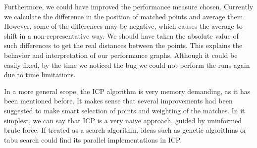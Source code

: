 \documentclass[11pt]{article}
\begin{document}
Furthermore, we could have improved the performance measure chosen. Currently we calculate the difference in the position of matched points and average them. However, some of the differences may be negative, which causes the average to shift in a non-representative way. We should have taken the absolute value of such differences to get the real distances between the points. This explains the behavior and interpretation of our performance graphs. Although it could be easily fixed, by the time we noticed the bug we could not perform the runs again due to time limitations.

In a more general scope, the ICP algorithm is very memory demanding, as it has been mentioned before. It makes sense that several improvements had been suggested to make smart selection of points and weighting of the matches. In it simplest, we can say that ICP is a very naive approach, guided by uninformed brute force. If treated as a search algorithm, ideas such as genetic algorithms or tabu search could find its parallel implementations in ICP.
\end{document}
